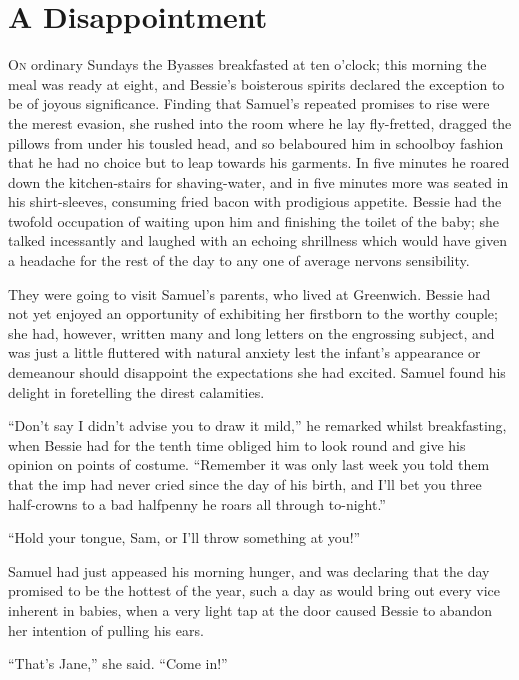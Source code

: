 \chapter{A Disappointment}

\textsc{On} ordinary Sundays the Byasses breakfasted at ten o'clock;
this morning the meal was ready at eight, and Bessie's boisterous
spirits declared the exception to be of joyous significance. Finding
that Samuel's repeated promises to rise were the merest evasion, she
rushed into the room where he lay fly-fretted, dragged the pillows from
under his tousled head, and so belaboured him in schoolboy fashion that
he had no choice but to leap towards his garments. In five minutes he
roared down the kitchen-stairs for shaving-water, and in five minutes
more was seated in his shirt-sleeves, consuming fried bacon with
prodigious appetite. Bessie had the twofold occupation of waiting upon
him and finishing the toilet of the baby; she talked {}incessantly and
laughed with an echoing shrillness which would have given a headache for
the rest of the day to any one of average nervons sensibility.

They were going to visit Samuel's parents, who lived at Greenwich.
Bessie had not yet enjoyed an opportunity of exhibiting her firstborn to
the worthy couple; she had, however, written many and long letters on
the engrossing subject, and was just a little fluttered with natural
anxiety lest the infant's appearance or demeanour should disappoint the
expectations she had excited. Samuel found his delight in foretelling
the direst calamities.

``Don't say I didn't advise you to draw it mild,'' he remarked whilst
breakfasting, when Bessie had for the tenth time obliged him to look
round and give his opinion on points of costume. ``Remember it was only
last week you told them that the imp had never cried since the day of
his birth, and I'll bet you three half-crowns to a bad halfpenny he
roars all through to-night.''

{}``Hold your tongue, Sam, or I'll throw something at you!''

Samuel had just appeased his morning hunger, and was declaring that the
day promised to be the hottest of the year, such a day as would bring
out every vice inherent in babies, when a very light tap at the door
caused Bessie to abandon her intention of pulling his ears.

``That's Jane,'' she said. ``Come in!''

